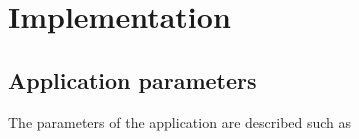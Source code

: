 
\section{Implementation}
\label{heat:impl}

\subsection{Application parameters}
\label{heat:param}

The parameters of the application are described such as 
%

